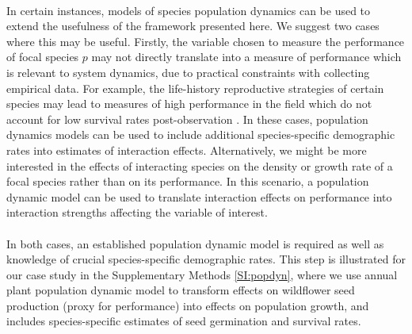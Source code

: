 \documentclass[a4,12pt]{article}
\begin{document}
\begin{refsection}
        \paragraph{}
        In certain instances, models of species population dynamics can be used to extend the usefulness of the framework presented here. We suggest two cases where this may be useful. Firstly, the variable chosen to measure the performance of focal species $p$ may not directly translate into a measure of performance which is relevant to system dynamics, due to practical constraints with collecting empirical data. For example, the life-history reproductive strategies of certain species may lead to measures of high performance in the field which do not account for low survival rates post-observation \parencite{Broekman2020}. In these cases, population dynamics models can be used to include additional species-specific demographic rates into estimates of interaction effects. Alternatively, we might be more interested in the effects of interacting species on the density or growth rate of a focal species rather than on its performance. In this scenario, a population dynamic model can be used to translate interaction effects on performance into interaction strengths affecting the variable of interest. 

        \paragraph{}
        In both cases, an established population dynamic model is required as well as knowledge of crucial species-specific demographic rates. This step is illustrated for our case study in the Supplementary Methods \ref{SI:popdyn}, where we use annual plant population dynamic model to transform effects on wildflower seed production (proxy for performance) into effects on population growth, and includes species-specific estimates of seed germination and survival rates. 




\end{refsection}
\end{document}
